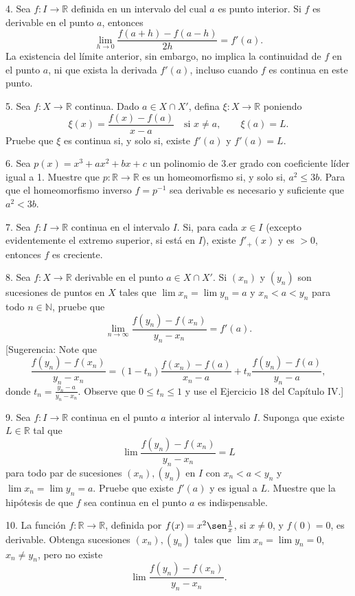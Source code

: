 \documentclass[12pt,oneside]{book}
\begin{document}
4. Sea \( f: I \to \mathbb{R} \) definida en un intervalo del cual \( a \) es punto interior. Si \( f \) es derivable en el punto \( a \), entonces
\[
\lim_{h \to 0} \frac{f(a + h) - f(a - h)}{2h} = f'(a).
\]
La existencia del límite anterior, sin embargo, no implica la continuidad de \( f \) en el punto \( a \), ni que exista la derivada \( f'(a) \), incluso cuando \( f \) es continua en este punto.

5. Sea \( f: X \to \mathbb{R} \) continua. Dado \( a \in X \cap X' \), defina \( \xi: X \to \mathbb{R} \) poniendo
\[
\xi(x) = \frac{f(x) - f(a)}{x - a} \quad \text{si } x \neq a, \qquad \xi(a) = L.
\]
Pruebe que \( \xi \) es continua si, y solo si, existe \( f'(a) \) y \( f'(a) = L \).

6. Sea \( p(x) = x^3 + ax^2 + bx + c \) un polinomio de 3.er grado con coeficiente líder igual a 1. Muestre que \( p: \mathbb{R} \to \mathbb{R} \) es un homeomorfismo si, y solo si, \( a^2 \leq 3b \). Para que el homeomorfismo inverso \( f = p^{-1} \) sea derivable es necesario y suficiente que \( a^2 < 3b \).

7. Sea \( f: I \to \mathbb{R} \) continua en el intervalo \( I \). Si, para cada \( x \in I \) (excepto evidentemente el extremo superior, si está en \( I \)), existe \( f'_+(x) \) y es \( > 0 \), entonces \( f \) es creciente.

8. Sea \( f: X \to \mathbb{R} \) derivable en el punto \( a \in X \cap X' \). Si \( (x_n) \) y \( (y_n) \) son sucesiones de puntos en \( X \) tales que \( \lim x_n = \lim y_n = a \) y \( x_n < a < y_n \) para todo \( n \in \mathbb{N} \), pruebe que
\[
\lim_{n \to \infty} \frac{f(y_n) - f(x_n)}{y_n - x_n} = f'(a).
\]
[Sugerencia: Note que
\[
\frac{f(y_n) - f(x_n)}{y_n - x_n} = (1 - t_n) \frac{f(x_n) - f(a)}{x_n - a} + t_n \frac{f(y_n) - f(a)}{y_n - a},
\]
donde \( t_n = \frac{y_n - a}{y_n - x_n} \). Observe que \( 0 \leq t_n \leq 1 \) y use el Ejercicio 18 del Capítulo IV.]

9. Sea \( f: I \to \mathbb{R} \) continua en el punto \( a \) interior al intervalo \( I \). Suponga que existe \( L \in \mathbb{R} \) tal que
\[
\lim \frac{f(y_n) - f(x_n)}{y_n - x_n} = L
\]
para todo par de sucesiones \( (x_n), (y_n) \) en \( I \) con \( x_n < a < y_n \) y \( \lim x_n = \lim y_n = a \). Pruebe que existe \( f'(a) \) y es igual a \( L \). Muestre que la hipótesis de que \( f \) sea continua en el punto \( a \) es indispensable.

10. La función \( f: \mathbb{R} \to \mathbb{R} \), definida por \( f(x) = x^2 \sen \frac{1}{x} \), si \( x \neq 0 \), y \( f(0) = 0 \), es derivable. Obtenga sucesiones \( (x_n), (y_n) \) tales que \( \lim x_n = \lim y_n = 0 \), \( x_n \neq y_n \), pero no existe
\[
\lim \frac{f(y_n) - f(x_n)}{y_n - x_n}.
\]
\end{document}
